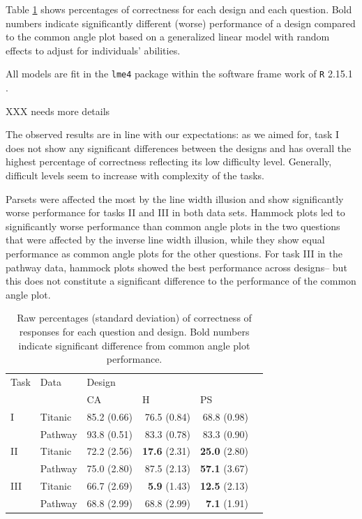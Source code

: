 Table \ref{raw} shows percentages of correctness for each design and each question. Bold numbers indicate significantly different (worse) performance of a design compared to the common angle plot based on a generalized linear model with random effects to adjust for individuals' abilities.


All models are fit in the {\tt lme4} package \cite{lmer} within the software frame work of {\tt R} 2.15.1 \cite{R}.

XXX needs more details

The observed results are in line with our expectations:
as we aimed for, task I does not show any significant differences between the designs and has overall the highest percentage of correctness reflecting its low difficulty level. Generally, difficult levels seem to increase with complexity of the tasks.

Parsets were affected the most by the line width illusion and show significantly worse performance for tasks II and III in both data sets. 
Hammock plots led to significantly worse performance than common angle plots in the two questions that were affected by the inverse line width illusion, while they show equal performance as common angle plots for the other questions. For task III in the pathway data,  hammock plots showed the best performance  across designs-- but this  does not  constitute a significant difference to the performance of the common angle plot.



%
\begin{table}[ht]
\begin{center}
\begin{tabular}{llrrrr}
  \hline
Task & Data & \multicolumn{3}{l}{Design} \\
& & \multicolumn{1}{l}{CA} & \multicolumn{1}{l}{H}  & \multicolumn{1}{l}{PS}  \\ 
  \hline
 I & Titanic & 85.2 (0.66) & 76.5 (0.84) & 68.8 (0.98) \\ 
& Pathway & 93.8 (0.51) & 83.3 (0.78) & 83.3 (0.90) \\ [3pt]
 II& Titanic & 72.2 (2.56) & {\bf 17.6} (2.31) & {\bf 25.0} (2.80) \\ 
& Pathway & 75.0 (2.80) & 87.5 (2.13) & {\bf 57.1} (3.67) \\ [3pt]
III & Titanic & 66.7 (2.69) & {\bf  5.9} (1.43) & {\bf 12.5} (2.13) \\ 
& Pathway & 68.8 (2.99) & 68.8 (2.99) & {\bf 7.1} (1.91) \\ \hline
\end{tabular}
\end{center}
\caption{\label{raw} Raw percentages (standard deviation) of correctness of responses for each question and design. Bold numbers indicate significant difference from common angle plot performance.  }
\end{table}

